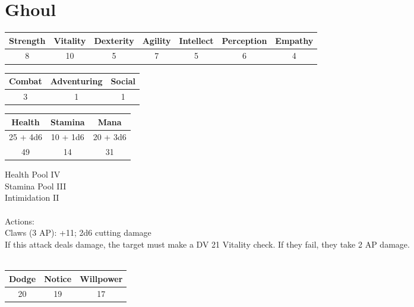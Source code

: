 \section{Ghoul}
\begin{minipage}[H]{1\textwidth}
    \centering
    \begin{tabular}[c]{|c | c | c | c | c | c | c|}
        \hline
        Strength & Vitality & Dexterity & Agility & Intellect & Perception & Empathy\\
        \hline
        8 & 10 & 5 & 7 & 5 & 6 & 4\\
        \hline
    \end{tabular}
\end{minipage}
\begin{minipage}[H]{1\textwidth}
    \centering
    \begin{tabular}[c]{|c | c | c|}
        \hline
        Combat & Adventuring & Social\\
        \hline
        3 & 1 & 1\\
        \hline
    \end{tabular}
\end{minipage}
\begin{minipage}[H]{1\textwidth}
    \centering
    \begin{tabular}[c]{|c | c | c|}
        \hline
        Health & Stamina & Mana\\
        \hline
        25 + 4d6 & 10 + 1d6 & 20 + 3d6\\
        49 & 14 & 31\\
        \hline
    \end{tabular}
\end{minipage}
Health Pool IV\\
Stamina Pool III\\
Intimidation II\\
\\
Actions:\\
Claws (3 AP): +11; 2d6 cutting damage\\
If this attack deals damage, the target must make a DV 21 Vitality check.
If they fail, they take 2 AP damage.\\
\\
\begin{minipage}[H]{1\textwidth}
    \centering
    \begin{tabular}[c]{|c | c | c|}
        \hline
        Dodge & Notice & Willpower\\
        \hline
        20 & 19 & 17\\
        \hline
    \end{tabular}
\end{minipage}
